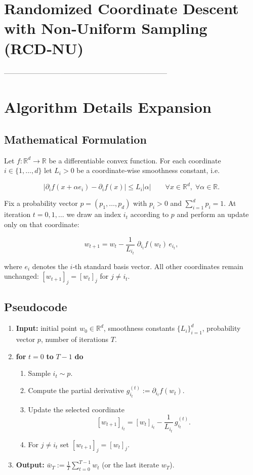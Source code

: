 \documentclass{article}
\newcommand{\R}{\mathbb{R}}
\begin{document}
\section*{Randomized Coordinate Descent with Non‑Uniform Sampling (RCD‑NU)}

---------------------------------------------------------------------

\section*{Algorithm Details Expansion}

\subsection*{Mathematical Formulation}
Let $f:\R^{d}\to\R$ be a differentiable convex function.  
For each coordinate $i\in\{1,\dots ,d\}$ let $L_i>0$ be a coordinate‑wise smoothness constant, i.e.

\[
\big| \partial_i f(x+ \alpha e_i)-\partial_i f(x) \big|\le L_i |\alpha|\qquad \forall x\in\R^{d},\;\forall \alpha\in\R .
\tag{A1}
\]

Fix a probability vector $p=(p_1,\dots ,p_d)$ with $p_i>0$ and $\sum_{i=1}^{d}p_i=1$.  
At iteration $t=0,1,\dots$ we draw an index $i_t$ according to $p$ and perform an update only on that coordinate:

\[
\boxed{
w_{t+1}= w_{t}-\frac{1}{L_{i_t}}\; \partial_{i_t} f(w_t)\, e_{i_t}},
\tag{1}
\]

where $e_i$ denotes the $i$‑th standard basis vector.  
All other coordinates remain unchanged: $[w_{t+1}]_j=[w_t]_j$ for $j\neq i_t$.

\subsection*{Pseudocode}
\begin{enumerate}[leftmargin=*]
\item \textbf{Input:} initial point $w_0\in\R^{d}$, smoothness constants $\{L_i\}_{i=1}^{d}$, probability vector $p$,
      number of iterations $T$.
\item \textbf{for} $t=0$ \textbf{to} $T-1$ \textbf{do}
   \begin{enumerate}
   \item Sample $i_t\sim p$.
   \item Compute the partial derivative $g_{i_t}^{(t)}:=\partial_{i_t} f(w_t)$.
   \item Update the selected coordinate
   \[
   [w_{t+1}]_{i_t}= [w_t]_{i_t}-\frac{1}{L_{i_t}}\,g_{i_t}^{(t)} .
   \]
   \item For $j\neq i_t$ set $[w_{t+1}]_{j}= [w_t]_{j}$.
   \end{enumerate}
\item \textbf{Output:} $\bar w_T:=\frac{1}{T}\sum_{t=0}^{T-1}w_t$ (or the last iterate $w_T$).
\end{enumerate}
\end{document}
